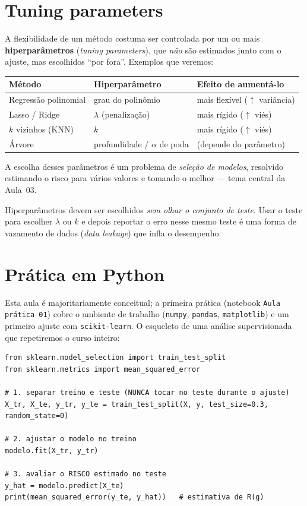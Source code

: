 \documentclass[11pt,a4paper]{article}
\begin{document}
\section{Tuning parameters}
A flexibilidade de um método costuma ser controlada por um ou mais
\textbf{hiperparâmetros} (\emph{tuning parameters}), que \emph{não} são estimados
junto com o ajuste, mas escolhidos ``por fora''. Exemplos que veremos:
\begin{center}\small
\renewcommand{\arraystretch}{1.25}
\begin{tabular}{@{}lll@{}}
\toprule
\textbf{Método} & \textbf{Hiperparâmetro} & \textbf{Efeito de aumentá-lo} \\
\midrule
Regressão polinomial & grau do polinômio & mais flexível ($\uparrow$ variância) \\
Lasso / Ridge        & $\lambda$ (penalização) & mais rígido ($\uparrow$ viés) \\
$k$ vizinhos (KNN)   & $k$ & mais rígido ($\uparrow$ viés) \\
Árvore               & profundidade / $\alpha$ de poda & (depende do parâmetro) \\
\bottomrule
\end{tabular}
\end{center}
A escolha desses parâmetros é um problema de \emph{seleção de modelos}, resolvido
estimando o risco para vários valores e tomando o melhor --- tema central da
Aula~03.

\begin{atencao}
Hiperparâmetros devem ser escolhidos \emph{sem olhar o conjunto de teste}. Usar o
teste para escolher $\lambda$ ou $k$ e depois reportar o erro nesse mesmo teste é
uma forma de vazamento de dados (\emph{data leakage}) que infla o desempenho.
\end{atencao}

\section{Prática em Python}
Esta aula é majoritariamente conceitual; a primeira prática (notebook
\texttt{Aula prática 01}) cobre o ambiente de trabalho (\texttt{numpy},
\texttt{pandas}, \texttt{matplotlib}) e um primeiro ajuste com
\texttt{scikit-learn}. O esqueleto de uma análise supervisionada que repetiremos o
curso inteiro:
\begin{lstlisting}
from sklearn.model_selection import train_test_split
from sklearn.metrics import mean_squared_error

# 1. separar treino e teste (NUNCA tocar no teste durante o ajuste)
X_tr, X_te, y_tr, y_te = train_test_split(X, y, test_size=0.3, random_state=0)

# 2. ajustar o modelo no treino
modelo.fit(X_tr, y_tr)

# 3. avaliar o RISCO estimado no teste
y_hat = modelo.predict(X_te)
print(mean_squared_error(y_te, y_hat))   # estimativa de R(g)
\end{lstlisting}
\end{document}
